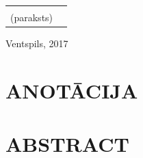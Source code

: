 \documentclass[12pt,paper=a4]{report}
\begin{document}
\begin{titlepage}
\begin{center}
\begin{tabular}{@{}r@{}l@{}}
{\mbox{}\hrulefill\vspace{-0.4em}\\
{\scriptsize(paraksts)}\vspace{2em}} \\
\end{tabular}
\vfill
Ventspils, 2017
\end{center}
\end{titlepage}
\setcounter{page}{2}

\chapter*{ANOTĀCIJA}
\chapter*{ABSTRACT}
\tableofcontents

\end{document}
